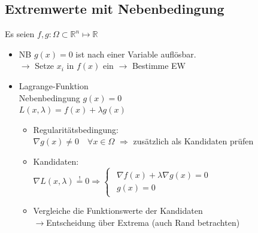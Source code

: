 \documentclass[6pt,a4paper]{scrartcl}
\newcommand{\Ra}[0]{\ensuremath{\Rightarrow}}                                  %
\newcommand{\ra}[0]{\ensuremath{\rightarrow}}                                  %
\newcommand{\R}{\ensuremath{\mathbb R}}
\begin{document}
\begin{multicols*}{4}
    \subsection{Extremwerte mit Nebenbedingung}
    Es seien $f,g:\Omega \subset \R^n \mapsto \R$
    \begin{itemize} \itemsep0pt
        \item NB $g(x) = 0$ ist nach einer Variable auflösbar. \\
              $\ra$ Setze $x_i$ in $f(x)$ ein $\ra$ Bestimme EW
        \item Lagrange-Funktion \\
              Nebenbedingung $g(x) = 0$\\
              $\boxed{L(x, \lambda) = f(x) + \lambda g(x)}$
              \begin{itemize} \itemsep0pt
                  \item Regularitätsbedingung: \\
                        $\nabla{g(x)} \neq 0 \quad \forall x \in \Omega$ $\Rightarrow$ zusätzlich als Kandidaten prüfen
                  \item Kandidaten: \\
                        $\nabla{L(x, \lambda)} \stackrel{!}{=} 0 \Ra \begin{cases}
                                \begin{array}{r}
                                    \nabla{f(x)} + \lambda\nabla{g(x)} = 0 \\
                                    g(x) = 0
                                \end{array}
                            \end{cases}$
                  \item Vergleiche die Funktionswerte der Kandidaten \\
                        \ra Entscheidung über Extrema (auch Rand betrachten)
              \end{itemize}
    \end{itemize}


\end{multicols*}
\end{document}
